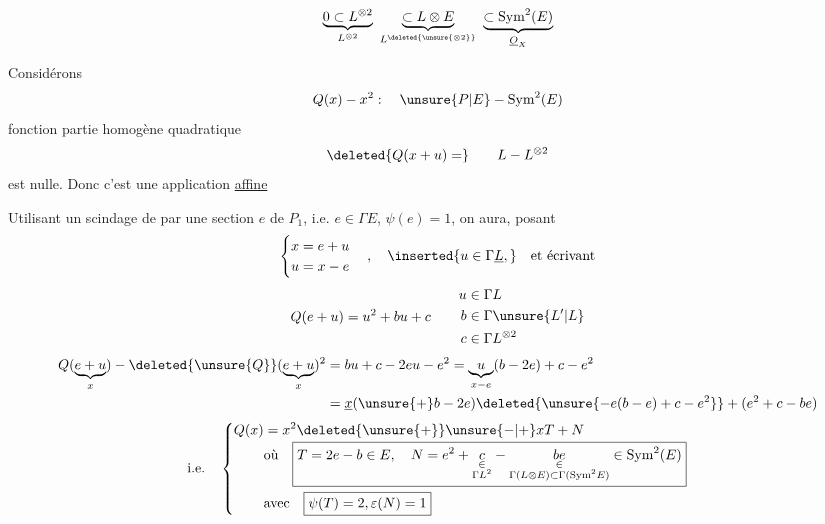 \[
\underbrace{0\subset L^{\otimes2}}_{L^{\otimes2}}\ \underbrace{\subset L\otimes E}_{L^{\deleted{\unsure{\otimes2}}}}\ \underbrace{\subset\mathrm{Sym}^2(E)}_{\underline O_X}
\]

Considérons 
\[
Q(x)-x^2:\quad\unsure{P|E}\mathbin{-}\mathrm{Sym}^2(E)
\]
fonction   partie homogène  quadratique
\[
\deleted{Q(x+u)=}\qquad L\mathbin{-}L^{\otimes2}
\]
est nulle. Donc c'est une application \uline{affine}


Utilisant un scindage de  par une section $e$ de $P_1$, i.e. $e\in\Gamma E$, $\psi(e)=1$, on aura, posant
\[
\begin{cases}x=e+u\\ u=x-e\end{cases},\quad\inserted{u\in\Gamma\underline L,}\quad\text{et écrivant}
\]
\[
Q(e+u)=u^2+bu+c\qquad\begin{aligned}u&\in\Gamma L\\ b&\in\Gamma\unsure{L'|L}\\ c&\in\Gamma L^{\otimes2}\end{aligned}
\]
\[
\begin{aligned}Q(\underbrace{e+u}_{x})-\deleted{\unsure{Q}}(\underbrace{e+u}_{x})^2&=bu+c-2eu-e^2=\underbrace{u}_{x-e}(b-2e)+c-e^2\\ &=\underline x(\unsure{+}b-2e)\deleted{\unsure{-e(b-e)+c-e^2}}+(e^2+c-be)\end{aligned}
\]
\[
\text{i.e.}\quad\left\{\begin{aligned}Q(x)&=x^2\deleted{\unsure{+}}\unsure{-|+}xT+N\\[-2pt] &\text{où}\quad\boxed{T=2e-b\in E,\quad N=e^2+\underset{\substack{\in\\\Gamma L^2}}{c}-\underset{\substack{\in\\\Gamma(L\otimes E)\subset\Gamma(\mathrm{Sym}^2E)}}{be}\in\mathrm{Sym}^2(E)}\\ &\text{avec}\quad\boxed{\psi(T)=2,\varepsilon(N)=1}\end{aligned}\right.
\]

